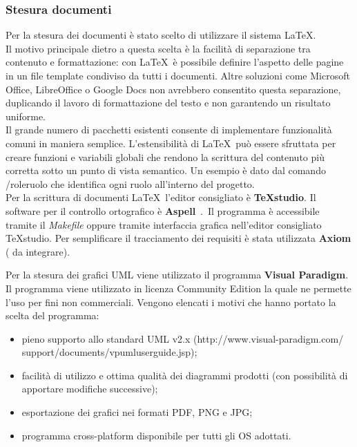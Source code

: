 \documentclass[a4paper,12pt]{article}
\newcounter{subsubsubsection}[subsubsection]
\begin{document}
{\subsubsection{Stesura documenti}
{
{ 
Per la stesura dei documenti è stato scelto di utilizzare il sistema \LaTeX.\\
Il motivo 
principale dietro a questa scelta è la facilità di separazione tra contenuto e formattazione: 
con \LaTeX\ è possibile definire l’aspetto delle pagine in un file template condiviso da tutti i documenti. Altre soluzioni come Microsoft Office, LibreOffice o Google Docs non 
avrebbero consentito questa separazione, duplicando il lavoro di formattazione del testo 
e non garantendo un risultato uniforme.\\
Il grande numero di pacchetti esistenti consente di implementare funzionalità comuni 
in maniera semplice. L’estensibilità di \LaTeX\ può essere sfruttata per creare funzioni e 
variabili globali che rendono la scrittura del contenuto più corretta sotto un punto di 
vista semantico. Un esempio è dato dal comando /role{ruolo} che identifica ogni ruolo 
all’interno del progetto.\\
Per la scrittura di documenti \LaTeX\  l’editor consigliato è \textbf{TeXstudio}. 
}
{
Il software per il controllo ortografico è \textbf{Aspell}\ .\ Il programma è accessibile tramite il \emph{Makefile} oppure tramite interfaccia grafica nell’editor consigliato TeXstudio.
}
{
Per semplificare il tracciamento dei requisiti è stata utilizzata \textbf{Axiom} ( da integrare).
}
{
Per la stesura dei grafici UML viene utilizzato il programma \textbf{Visual Paradigm}. Il programma viene utilizzato in licenza Community Edition la quale ne permette l’uso per fini non commerciali.
Vengono elencati i motivi che hanno portato la scelta del programma:
\begin{itemize}
\item pieno supporto allo standard UML v2.x (http://www.visual-paradigm.com/
support/documents/vpumluserguide.jsp);
\item facilità di utilizzo e ottima qualità dei diagrammi prodotti (con possibilità di apportare modifiche successive);
\item esportazione dei grafici nei formati PDF, PNG e JPG;
\item programma cross-platform disponibile per tutti gli OS adottati.
\end{itemize}
}
}

}
\end{document}

